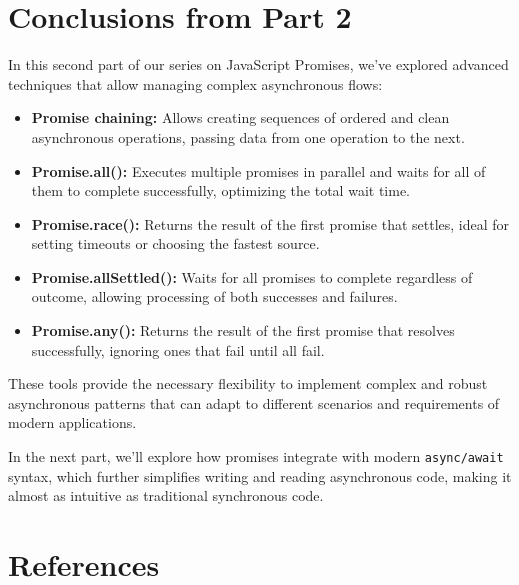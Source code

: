 \documentclass[12pt,letterpaper]{article}
\begin{document}
\section{Conclusions from Part 2}

In this second part of our series on JavaScript Promises, we've explored advanced techniques that allow managing complex asynchronous flows:

\begin{itemize}
    \item \textbf{\textcolor{accentColor}{Promise chaining:}} Allows creating sequences of ordered and clean asynchronous operations, passing data from one operation to the next.
    
    \item \textbf{\textcolor{accentColor}{Promise.all():}} Executes multiple promises in parallel and waits for all of them to complete successfully, optimizing the total wait time.
    
    \item \textbf{\textcolor{accentColor}{Promise.race():}} Returns the result of the first promise that settles, ideal for setting timeouts or choosing the fastest source.
    
    \item \textbf{\textcolor{accentColor}{Promise.allSettled():}} Waits for all promises to complete regardless of outcome, allowing processing of both successes and failures.
    
    \item \textbf{\textcolor{accentColor}{Promise.any():}} Returns the result of the first promise that resolves successfully, ignoring ones that fail until all fail.
\end{itemize}

These tools provide the necessary flexibility to implement complex and robust asynchronous patterns that can adapt to different scenarios and requirements of modern applications.

In the next part, we'll explore how promises integrate with modern \texttt{\textcolor{accentColor}{async/await}} syntax, which further simplifies writing and reading asynchronous code, making it almost as intuitive as traditional synchronous code.

\section{References}
\end{document}
